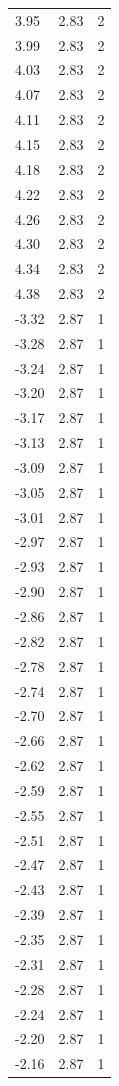 \begin{longtable}{lrr}
  3.95 & 2.83 & 2 \\
  3.99 & 2.83 & 2 \\
  4.03 & 2.83 & 2 \\
  4.07 & 2.83 & 2 \\
  4.11 & 2.83 & 2 \\
  4.15 & 2.83 & 2 \\
  4.18 & 2.83 & 2 \\
  4.22 & 2.83 & 2 \\
  4.26 & 2.83 & 2 \\
  4.30 & 2.83 & 2 \\
  4.34 & 2.83 & 2 \\
  4.38 & 2.83 & 2 \\
  -3.32 & 2.87 & 1 \\
  -3.28 & 2.87 & 1 \\
  -3.24 & 2.87 & 1 \\
  -3.20 & 2.87 & 1 \\
  -3.17 & 2.87 & 1 \\
  -3.13 & 2.87 & 1 \\
  -3.09 & 2.87 & 1 \\
  -3.05 & 2.87 & 1 \\
  -3.01 & 2.87 & 1 \\
  -2.97 & 2.87 & 1 \\
  -2.93 & 2.87 & 1 \\
  -2.90 & 2.87 & 1 \\
  -2.86 & 2.87 & 1 \\
  -2.82 & 2.87 & 1 \\
  -2.78 & 2.87 & 1 \\
  -2.74 & 2.87 & 1 \\
  -2.70 & 2.87 & 1 \\
  -2.66 & 2.87 & 1 \\
  -2.62 & 2.87 & 1 \\
  -2.59 & 2.87 & 1 \\
  -2.55 & 2.87 & 1 \\
  -2.51 & 2.87 & 1 \\
  -2.47 & 2.87 & 1 \\
  -2.43 & 2.87 & 1 \\
  -2.39 & 2.87 & 1 \\
  -2.35 & 2.87 & 1 \\
  -2.31 & 2.87 & 1 \\
  -2.28 & 2.87 & 1 \\
  -2.24 & 2.87 & 1 \\
  -2.20 & 2.87 & 1 \\
  -2.16 & 2.87 & 1 \\

\end{longtable}
